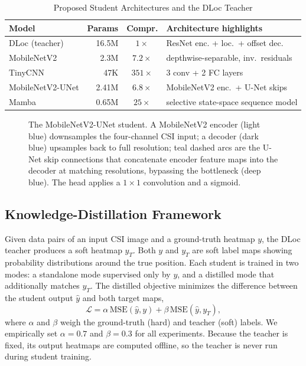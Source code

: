 \documentclass[conference]{IEEEtran}
\begin{document}
\begin{table}[t]
\caption{Proposed Student Architectures and the DLoc Teacher}
\label{tab:arch}
\centering
\footnotesize
\setlength{\tabcolsep}{4pt}
\begin{tabular}{@{}lrcl@{}}
\toprule
\textbf{Model} & \textbf{Params} & \textbf{Compr.} & \textbf{Architecture highlights} \\
\midrule
DLoc (teacher)   & 16.5M & $1\times$   & ResNet enc. + loc.\ + offset dec. \\
MobileNetV2      & 2.3M  & $7.2\times$ & depthwise-separable, inv.\ residuals \\
TinyCNN          & 47K   & $351\times$ & 3 conv + 2 FC layers \\
MobileNetV2-UNet & 2.41M & $6.8\times$ & MobileNetV2 enc.\ + U-Net skips \\
Mamba            & 0.65M & $25\times$  & selective state-space sequence model \\
\bottomrule
\end{tabular}
\end{table}

\begin{figure}[t]
\centering
\resizebox{\textwidth}{!}{}
\caption{The MobileNetV2-UNet student. A MobileNetV2 encoder (light blue) downsamples the four-channel CSI input; a decoder (dark blue) upsamples back to full resolution; teal dashed arcs are the U-Net skip connections that concatenate encoder feature maps into the decoder at matching resolutions, bypassing the bottleneck (deep blue). The head applies a $1{\times}1$ convolution and a sigmoid.}
\label{fig:unet}
\end{figure}

\subsection{Knowledge-Distillation Framework}
Given data pairs of an input CSI image and a ground-truth heatmap $y$, the DLoc teacher produces a soft heatmap $y_T$. Both $y$ and $y_T$ are soft label maps showing probability distributions around the true position. Each student is trained in two modes: a standalone mode supervised only by $y$, and a distilled mode that additionally matches $y_T$. The distilled objective minimizes the difference between the student output $\hat{y}$ and both target maps,
\begin{equation}
\mathcal{L} = \alpha\,\mathrm{MSE}(\hat{y}, y) + \beta\,\mathrm{MSE}(\hat{y}, y_T),
\label{eq:loss}
\end{equation}
where $\alpha$ and $\beta$ weigh the ground-truth (hard) and teacher (soft) labels. We empirically set $\alpha = 0.7$ and $\beta = 0.3$ for all experiments. Because the teacher is fixed, its output heatmaps are computed offline, so the teacher is never run during student training.
\end{document}
